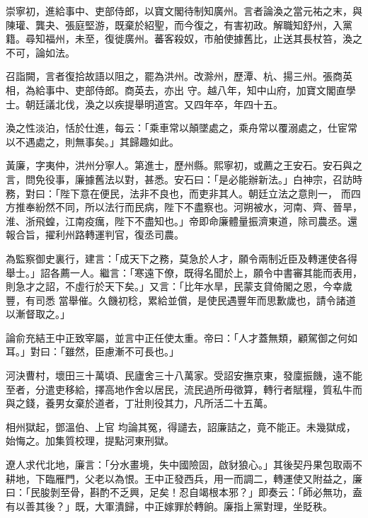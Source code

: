 \begin{pinyinscope}
 崇寧初，進給事中、吏部侍郎，以寶文閣待制知廣州。言者論渙之當元祐之末，與陳瓘、龔夬、張庭堅游，既棄於紹聖，而今復之，有害初政。解職知舒州，入黨籍。尋知福州，未至，復徙廣州。蕃客殺奴，市舶使據舊比，止送其長杖笞，渙之不可，論如法。



 召詣闕，言者復拾故語以阻之，罷為洪州。改滁州，歷潭、杭、揚三州。張商英相，為給事中、吏部侍郎。商英去，亦出
 守。越八年，知中山府，加寶文閣直學士。朝廷議北伐，渙之以疾提舉明道宮。又四年卒，年四十五。



 渙之性淡泊，恬於仕進，每云：「乘車常以顛墜處之，乘舟常以覆溺處之，仕宦常以不遇處之，則無事矣。」其歸趣如此。



 黃廉，字夷仲，洪州分寧人。第進士，歷州縣。熙寧初，或薦之王安石。安石與之言，問免役事，廉據舊法以對，甚悉。安石曰：「是必能辦新法。」白神宗，召訪時務，對曰：「陛下意在便民，法非不良也，而吏非其人。朝廷立法之意則一，
 而四方推奉紛然不同，所以法行而民病，陛下不盡察也。河朔被水，河南、齊、晉旱，淮、浙飛蝗，江南疫癘，陛下不盡知也。」帝即命廉體量振濟東道，除司農丞。還報合旨，擢利州路轉運判官，復丞司農。



 為監察御史裏行，建言：「成天下之務，莫急於人才，願令兩制近臣及轉運使各得舉士。」詔各薦一人。繼言：「寒遠下僚，既得名聞於上，願令中書審其能而表用，則急才之詔，不虛行於天下矣。」又言：「比年水旱，民蒙支貸倚閣之恩，今幸歲豐，有司悉
 當舉催。久饑初稔，累給並償，是使民遇豐年而思歉歲也，請令諸道以漸督取之。」



 論俞充結王中正致宰屬，並言中正任使太重。帝曰：「人才蓋無類，顧駕御之何如耳。」對曰：「雖然，臣慮漸不可長也。」



 河決曹村，壞田三十萬頃、民廬舍三十八萬家。受詔安撫京東，發廩振饑，遠不能至者，分遣吏移給，擇高地作舍以居民，流民過所毋徵算，轉行者賦糧，質私牛而與之錢，養男女棄於道者，丁壯則役其力，凡所活二十五萬。



 相州獄起，鄧溫伯、上官
 均論其冤，得譴去，詔廉詰之，竟不能正。未幾獄成，始悔之。加集質校理，提點河東刑獄。



 遼人求代北地，廉言：「分水畫境，失中國險固，啟豺狼心。」其後契丹果包取兩不耕地，下臨雁門，父老以為恨。王中正發西兵，用一而調二，轉運使又附益之，廉曰：「民朘剝至骨，斟酌不乏興，足矣！忍自竭根本邪？」即奏云：「師必無功，盍有以善其後？」既，大軍潰歸，中正嫁罪於轉餉。廉指上黨對理，坐貶秩。




\end{pinyinscope}
